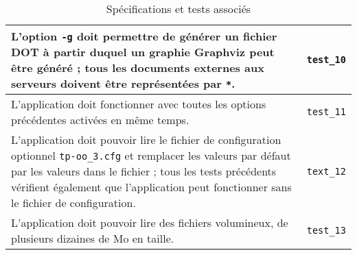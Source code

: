\documentclass[11pt,a4paper]{article}
\begin{document}
\begin{center}
\begin{table}[!h]
\begin{tabularx}{\textwidth}{ | X | p{1.5cm} | }
				L'option \texttt{-g} doit permettre de générer un fichier DOT à partir duquel un graphie Graphviz peut être généré ; tous les documents externes aux serveurs doivent être représentées par \texttt{*}. & \texttt{test\_10} \\ \hline
				L'application doit fonctionner avec toutes les options précédentes activées en même temps. & \texttt{test\_11} \\ \hline
				L'application doit pouvoir lire le fichier de configuration optionnel \texttt{tp-oo\_3.cfg} et remplacer les valeurs par défaut par les valeurs dans le fichier ; tous les tests précédents vérifient également que l'application peut fonctionner sans le fichier de configuration. & \texttt{text\_12} \\ \hline
				L'application doit pouvoir lire des fichiers volumineux, de plusieurs dizaines de Mo en taille. & \texttt{test\_13} \\ \hline
			\end{tabularx}
			\caption{Spécifications et tests associés}
			\label{tab:specifications}
		\end{table}
	\end{center}
	
\end{document}

